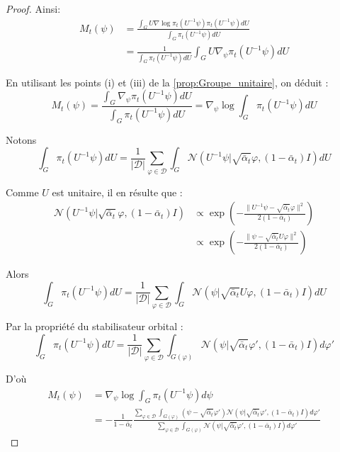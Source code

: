 \documentclass[a4paper,10pt]{article}
\theoremstyle{definition} %
\theoremstyle{definition} %
\theoremstyle{definition} %
\theoremstyle{definition} %
\begin{document}
\begin{proof}
Ainsi:
\begin{align*}
    M_t(\psi) &= \frac{\int_G U\nabla \log \pi_t(U^{-1}\psi) \pi_t(U^{-1}\psi) dU}{\int_G \pi_t(U^{-1}\psi) dU} \\
    &= \frac{1}{\int_{G} \pi_t(U^{-1}\psi) dU} \int_{G} U \nabla_\psi \pi_t(U^{-1}\psi) dU
\end{align*}


En utilisant les points (i) et (iii) de la \cref{prop:Groupe_unitaire}, on déduit :
\[
M_t(\psi) = \frac{\int_{G} \nabla_\psi \pi_t(U^{-1}\psi) dU}{\int_{G} \pi_t(U^{-1}\psi) dU} = \nabla_\psi \log \int_{G} \pi_t(U^{-1}\psi) dU
\]

Notons
\[
\int_{G} \pi_t(U^{-1}\psi) dU = \frac{1}{|\mathcal{D}|} \sum_{\varphi \in \mathcal{D}} \int_{G} \mathcal{N}(U^{-1}\psi | \sqrt{\bar \alpha_t} \varphi, (1-\bar \alpha_t) I) dU
\]

Comme $U$ est unitaire, il en résulte que :
\begin{align*}
    \mathcal{N}(U^{-1}\psi | \sqrt{\bar \alpha_t} \varphi, (1-\bar \alpha_t) I) &\propto \exp \left( -\frac{\|U^{-1}\psi - \sqrt{\bar \alpha_t} \varphi\|^2}{2(1-\bar \alpha_t)} \right) \\
    & \propto \exp \left( -\frac{\|\psi - \sqrt{\bar \alpha_t} U \varphi\|^2}{2(1-\bar \alpha_t)} \right)
\end{align*}




Alors
\[
\int_{G} \pi_t(U^{-1}\psi) dU = \frac{1}{|\mathcal{D}|} \sum_{\varphi \in \mathcal{D}} \int_{G} \mathcal{N}(\psi | \sqrt{\bar \alpha_t} U \varphi, (1-\bar \alpha_t) I) dU
\]

Par la propriété du stabilisateur orbital :
\[
\int_{G} \pi_t(U^{-1}\psi) dU = \frac{1}{|\mathcal{D}|} \sum_{\varphi \in \mathcal{D}} \int_{G(\varphi)} \mathcal{N}(\psi | \sqrt{\bar \alpha_t} \varphi', (1-\bar \alpha_t) I) d\varphi'
\]

D'où
\begin{align*}
    M_t(\psi) &= \nabla_\psi \log \int_{G} \pi_t(U^{-1}\psi) d\psi\\
    &= -\frac{1}{1-\bar \alpha_t} \frac{\sum_{\varphi \in \mathcal{D}} \int_{G(\varphi)} (\psi - \sqrt{\bar \alpha_t} \varphi') \mathcal{N}(\psi | \sqrt{\bar \alpha_t} \varphi', (1-\bar \alpha_t) I) d\varphi'}{\sum_{\varphi \in \mathcal{D}} \int_{G(\varphi)} \mathcal{N}(\psi | \sqrt{\bar \alpha_t} \varphi', (1-\bar \alpha_t) I) d\varphi'}
\end{align*}
\end{proof}


 
\end{document}

